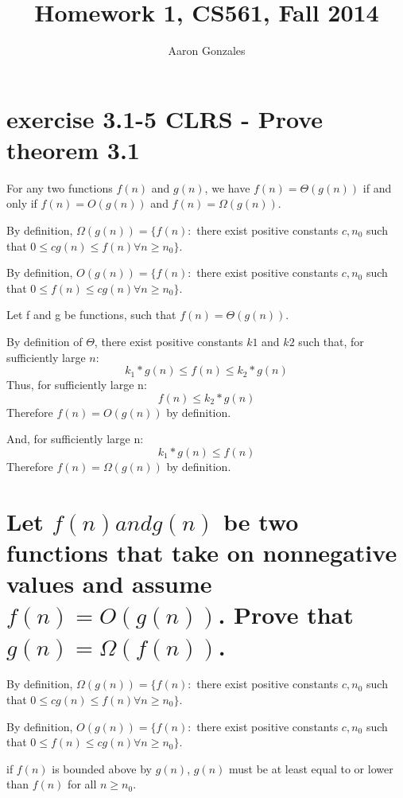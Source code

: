 \documentclass[titlepage]{article}\usepackage[]{graphicx}\usepackage[]{color}
\begin{document}
\title{Homework 1, CS561, Fall 2014}
\author{Aaron Gonzales}
\maketitle




\section{ exercise 3.1-5 CLRS - Prove theorem 3.1}
For any two functions $f(n)$ and $g(n)$, we have $f(n) = \Theta(g(n))$ if and
only if $f(n) = O(g(n))$ and $f(n) = \Omega(g(n))$.

By definition, $\Omega(g(n)) = \{ f(n) : $ there exist positive constants $c, n_0$
such that $0 \leq cg(n) \leq f(n) \forall  n \geq n_0\}$.

By definition, $O(g(n)) = \{ f(n) : $ there exist positive constants $c, n_0$
such that $0 \leq f(n) \leq cg(n) \forall  n \geq n_0\}$.

Let f and g be functions, such that $f(n)=\Theta(g(n))$.

By definition of $\Theta$, there exist positive constants $k1$ and $k2$ such
that, for sufficiently large $n$:
\[ k_1 * g(n)\leq f(n) \leq k_2* g(n) \]
Thus, for sufficiently large n:
\[ f(n) \leq k_2*g(n) \]
Therefore $f(n)=O(g(n))$ by definition.

And, for sufficiently large n:
\[ k_1*g(n)\leq f(n)\]
Therefore $f(n)=\Omega(g(n))$ by definition.


\section{ Let $f(n) and g(n)$ be two functions that take on nonnegative values and
assume $f(n) = O(g(n))$. Prove that $g(n) =\Omega(f(n))$.}

By definition, $\Omega(g(n)) = \{ f(n) : $ there exist positive constants $c, n_0$
such that $0 \leq cg(n) \leq f(n) \forall  n \geq n_0\}$.

By definition, $O(g(n)) = \{ f(n) : $ there exist positive constants $c, n_0$
such that $0 \leq f(n) \leq cg(n) \forall  n \geq n_0\}$.

if $f(n)$ is bounded above by $g(n)$, $g(n)$ must be at least equal to or
lower than $f(n)$ for all $n \geq n_0$.
\end{document}

